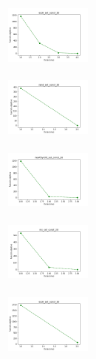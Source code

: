 \begin{figure}[H]
    \begin{subfigure}
        \centering
        \includegraphics[width=0.234\textwidth]{img/copkm2/ecoli_set_const_20_589741062_cost.png}
    \end{subfigure}
    \hfill
    \begin{subfigure}
        \centering
        \includegraphics[width=0.234\textwidth]{img/copkm2/rand_set_const_20_589741062_cost.png}
    \end{subfigure}
    \hfill
    \begin{subfigure}
        \centering
        \includegraphics[width=0.234\textwidth]{img/copkm2/newthyroid_set_const_20_589741062_cost.png}
    \end{subfigure}
    \hfill
    \begin{subfigure}
        \centering
        \includegraphics[width=0.234\textwidth]{img/copkm2/iris_set_const_20_277451237_cost.png}
    \end{subfigure}
    \hfill
    \begin{subfigure}
        \centering
        \includegraphics[width=0.234\textwidth]{img/copkm2/ecoli_set_const_20_277451237_cost.png}
    \end{subfigure}
    \hfill
    \begin{subfigure}

\end{subfigure}
\end{figure}
